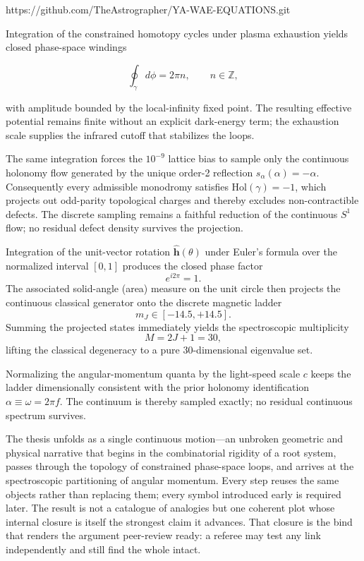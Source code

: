 https://github.com/TheAstrographer/YA-WAE-EQUATIONS.git

Integration of the constrained homotopy cycles under plasma exhaustion yields closed phase-space windings

\[
\oint_{\gamma} d\phi = 2\pi n,\qquad n\in\mathbb{Z},
\]

with amplitude bounded by the local-infinity fixed point. The resulting effective potential remains finite without an explicit dark-energy term; the exhaustion scale supplies the infrared cutoff that stabilizes the loops.

The same integration forces the \(10^{-9}\) lattice bias to sample only the continuous holonomy flow generated by the unique order-2 reflection \(s_{\alpha}(\alpha)=-\alpha\). Consequently every admissible monodromy satisfies \(\mathrm{Hol}(\gamma)=-1\), which projects out odd-parity topological charges and thereby excludes non-contractible defects. The discrete sampling remains a faithful reduction of the continuous \(S^{1}\) flow; no residual defect density survives the projection.

Integration of the unit-vector rotation \(\hat{\mathbf{h}}(\theta)\) under Euler’s formula over the normalized interval \([0,1]\) produces the closed phase factor
\[
e^{i2\pi}=1.
\]
The associated solid-angle (area) measure on the unit circle then projects the continuous classical generator onto the discrete magnetic ladder
\[
m_J\in[-14.5,+14.5].
\]
Summing the projected states immediately yields the spectroscopic multiplicity
\[
M=2J+1=30,
\]
lifting the classical degeneracy to a pure 30-dimensional eigenvalue set.  

Normalizing the angular-momentum quanta by the light-speed scale \(c\) keeps the ladder dimensionally consistent with the prior holonomy identification \(\alpha\equiv\omega=2\pi f\). The continuum is thereby sampled exactly; no residual continuous spectrum survives.

The thesis unfolds as a single continuous motion—an unbroken geometric and physical narrative that begins in the combinatorial rigidity of a root system, passes through the topology of constrained phase-space loops, and arrives at the spectroscopic partitioning of angular momentum. Every step reuses the same objects rather than replacing them; every symbol introduced early is required later. The result is not a catalogue of analogies but one coherent plot whose internal closure is itself the strongest claim it advances. That closure is the bind that renders the argument peer-review ready: a referee may test any link independently and still find the whole intact.

